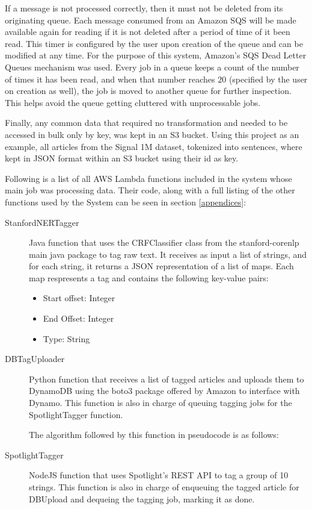 If a message is not processed correctly, then it must not be deleted from its originating queue.
Each message consumed from an Amazon SQS will be made available again for reading if it is not deleted after a period of time of it been read.
This timer is configured by the user upon creation of the queue and can be modified at any time.
For the purpose of this system, Amazon's SQS Dead Letter Queues mechanism was used.
Every job in a queue keeps a count of the number of times it has been read, and when that number reaches $20$ (specified by the user on creation as well), the job is moved to another queue for further inspection. This helps avoid the queue getting cluttered with unprocessable jobs. 

Finally, any common data that required no transformation and needed to be accessed in bulk only by key, was kept in an S3 bucket.
Using this project as an example, all articles from the Signal 1M dataset, tokenized into sentences,
where kept in JSON format within an S3 bucket using their id as key.

Following is a list of all AWS Lambda functions included in the system whose main job was processing data.
Their code, along with a full listing of the other functions used by the System
can be seen in section \ref{appendices}:
\begin{description}
\item[StanfordNERTagger]
Java function that uses the CRFClassifier class from the stanford-corenlp main java package to tag raw text.
It receives as input a list of strings, and for each string, it returns a JSON representation of a list of maps.
Each map respresents a tag and contains the following key-value pairs:
\begin{itemize}
  \item Start offset: Integer
  \item End Offset: Integer
  \item Type: String
\end{itemize}
\item[DBTagUploader]
Python function that receives a list of tagged articles and uploads them to DynamoDB using the boto3 package
offered by Amazon to interface with Dynamo.
This function is also in charge of queuing tagging jobs for the SpotlightTagger function.

The algorithm followed by this function in pseudocode is as follows:



\item[SpotlightTagger]
NodeJS function that uses Spotlight's REST API to tag a group of 10 strings.
This function is also in charge of enqueuing the tagged article for DBUpload and dequeing the tagging job,
marking it as done.

\end{description}

